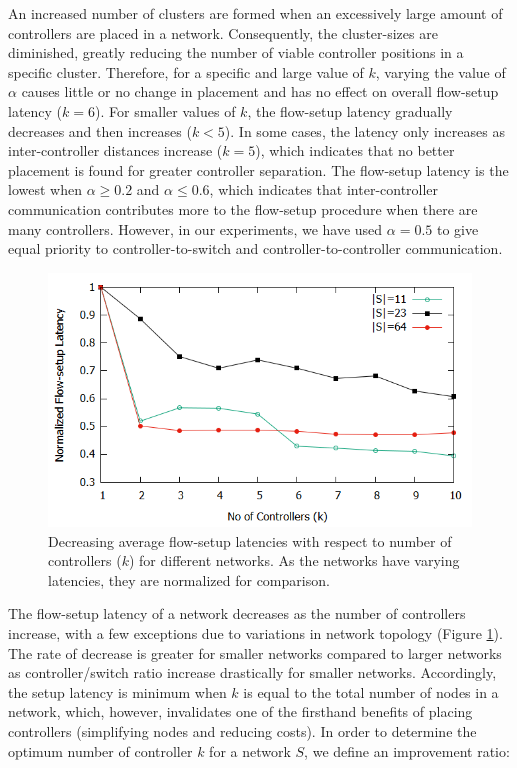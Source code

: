 \documentclass[a4paper,fleqn]{cas-dc}
\begin{document}
An increased number of clusters are formed when an excessively large amount of controllers are placed in a network. Consequently, the cluster-sizes are diminished, greatly reducing the number of viable controller positions in a specific cluster. Therefore, for a specific and large value of $k$, varying the value of $\alpha$ causes little or no change in placement and has no effect on overall flow-setup latency ($k=6$). For smaller values of $k$, the flow-setup latency gradually decreases and then increases ($k<5$). In some cases, the latency only increases as inter-controller distances increase ($k=5$), which indicates that no better placement is found for greater controller separation. The flow-setup latency is the lowest when $\alpha \ge 0.2$ and $\alpha \le 0.6$, which indicates that inter-controller communication contributes more to the flow-setup procedure when there are many controllers. However, in our experiments, we have used $\alpha=0.5$ to give equal priority to controller-to-switch and controller-to-controller communication.

\begin{figure}
	\centering
	\includegraphics[width=0.95\linewidth]{Images/k_vs_l.png}
	\caption{Decreasing average flow-setup latencies with respect to number of controllers ($k$) for different networks. As the networks have varying latencies, they are normalized for comparison.} \label{fig:KvsL}
\end{figure}

The flow-setup latency of a network decreases as the number of controllers increase, with a few exceptions due to variations in network topology (Figure \ref{fig:KvsL}). The rate of decrease is greater for smaller networks compared to larger networks as controller/switch ratio increase drastically for smaller networks. Accordingly, the setup latency is minimum when $k$ is equal to the total number of nodes in a network, which, however, invalidates one of the firsthand benefits of placing controllers (simplifying nodes and reducing costs). In order to determine the optimum number of controller $k$ for a network $S$, we define an improvement ratio:
\end{document}
